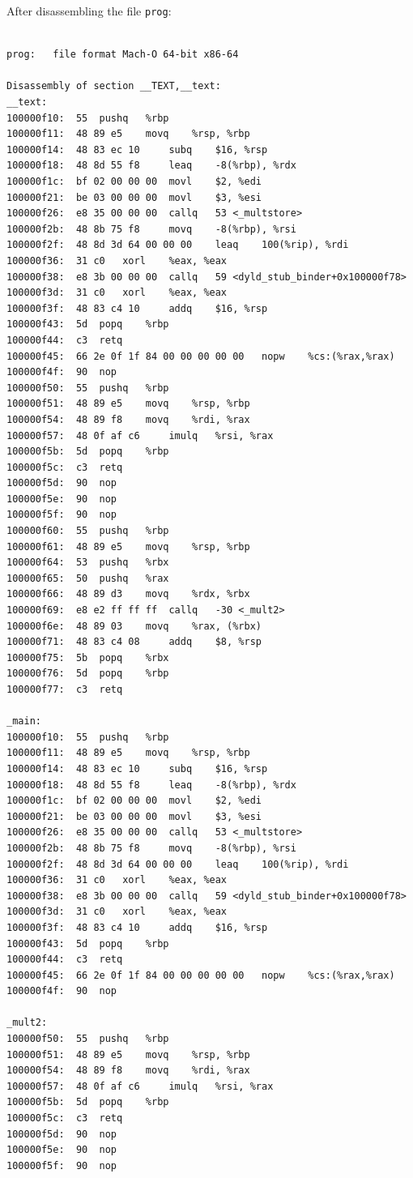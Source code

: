 \documentclass[11pt]{article}
\begin{document}
After disassembling the file \texttt{prog}:\\
\begin{verbatim}

prog:	file format Mach-O 64-bit x86-64

Disassembly of section __TEXT,__text:
__text:
100000f10:	55 	pushq	%rbp
100000f11:	48 89 e5 	movq	%rsp, %rbp
100000f14:	48 83 ec 10 	subq	$16, %rsp
100000f18:	48 8d 55 f8 	leaq	-8(%rbp), %rdx
100000f1c:	bf 02 00 00 00 	movl	$2, %edi
100000f21:	be 03 00 00 00 	movl	$3, %esi
100000f26:	e8 35 00 00 00 	callq	53 <_multstore>
100000f2b:	48 8b 75 f8 	movq	-8(%rbp), %rsi
100000f2f:	48 8d 3d 64 00 00 00 	leaq	100(%rip), %rdi
100000f36:	31 c0 	xorl	%eax, %eax
100000f38:	e8 3b 00 00 00 	callq	59 <dyld_stub_binder+0x100000f78>
100000f3d:	31 c0 	xorl	%eax, %eax
100000f3f:	48 83 c4 10 	addq	$16, %rsp
100000f43:	5d 	popq	%rbp
100000f44:	c3 	retq
100000f45:	66 2e 0f 1f 84 00 00 00 00 00 	nopw	%cs:(%rax,%rax)
100000f4f:	90 	nop
100000f50:	55 	pushq	%rbp
100000f51:	48 89 e5 	movq	%rsp, %rbp
100000f54:	48 89 f8 	movq	%rdi, %rax
100000f57:	48 0f af c6 	imulq	%rsi, %rax
100000f5b:	5d 	popq	%rbp
100000f5c:	c3 	retq
100000f5d:	90 	nop
100000f5e:	90 	nop
100000f5f:	90 	nop
100000f60:	55 	pushq	%rbp
100000f61:	48 89 e5 	movq	%rsp, %rbp
100000f64:	53 	pushq	%rbx
100000f65:	50 	pushq	%rax
100000f66:	48 89 d3 	movq	%rdx, %rbx
100000f69:	e8 e2 ff ff ff 	callq	-30 <_mult2>
100000f6e:	48 89 03 	movq	%rax, (%rbx)
100000f71:	48 83 c4 08 	addq	$8, %rsp
100000f75:	5b 	popq	%rbx
100000f76:	5d 	popq	%rbp
100000f77:	c3 	retq

_main:
100000f10:	55 	pushq	%rbp
100000f11:	48 89 e5 	movq	%rsp, %rbp
100000f14:	48 83 ec 10 	subq	$16, %rsp
100000f18:	48 8d 55 f8 	leaq	-8(%rbp), %rdx
100000f1c:	bf 02 00 00 00 	movl	$2, %edi
100000f21:	be 03 00 00 00 	movl	$3, %esi
100000f26:	e8 35 00 00 00 	callq	53 <_multstore>
100000f2b:	48 8b 75 f8 	movq	-8(%rbp), %rsi
100000f2f:	48 8d 3d 64 00 00 00 	leaq	100(%rip), %rdi
100000f36:	31 c0 	xorl	%eax, %eax
100000f38:	e8 3b 00 00 00 	callq	59 <dyld_stub_binder+0x100000f78>
100000f3d:	31 c0 	xorl	%eax, %eax
100000f3f:	48 83 c4 10 	addq	$16, %rsp
100000f43:	5d 	popq	%rbp
100000f44:	c3 	retq
100000f45:	66 2e 0f 1f 84 00 00 00 00 00 	nopw	%cs:(%rax,%rax)
100000f4f:	90 	nop

_mult2:
100000f50:	55 	pushq	%rbp
100000f51:	48 89 e5 	movq	%rsp, %rbp
100000f54:	48 89 f8 	movq	%rdi, %rax
100000f57:	48 0f af c6 	imulq	%rsi, %rax
100000f5b:	5d 	popq	%rbp
100000f5c:	c3 	retq
100000f5d:	90 	nop
100000f5e:	90 	nop
100000f5f:	90 	nop


\end{verbatim}
\end{document}
